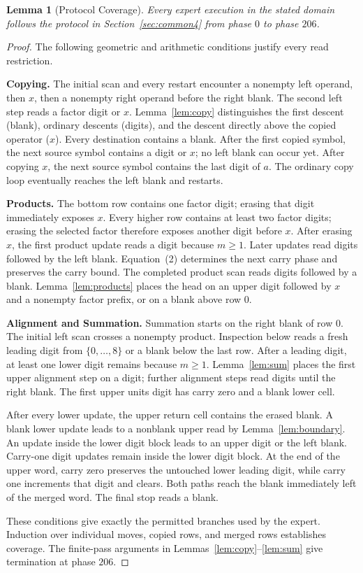 \documentclass[11pt,a4paper]{article}
\newtheorem{lemma}{Lemma}
\begin{document}
\begin{lemma}[Protocol Coverage]\label{lem:coverage}
Every expert execution in the stated domain follows the protocol in Section~\ref{sec:common4}
from phase $0$ to phase $206$.
\end{lemma}
\begin{proof}
The following geometric and arithmetic conditions justify every read restriction.

\textbf{Copying.}
The initial scan and every restart encounter a nonempty left operand,
then $x$, then a nonempty right operand before the right blank.
The second left step reads a factor digit or $x$.
Lemma~\ref{lem:copy} distinguishes the first descent (blank), ordinary descents
(digits), and the descent directly above the copied operator ($x$).
Every destination contains a blank. After the first copied symbol, the next
source symbol contains a digit or $x$; no left blank can occur yet.
After copying $x$, the next source symbol contains the last digit of $a$.
The ordinary copy loop eventually reaches the left blank and restarts.

\textbf{Products.}
The bottom row contains one factor digit; erasing that digit immediately
exposes $x$. Every higher row contains at least two factor digits;
erasing the selected factor therefore exposes another digit before $x$.
After erasing $x$, the first product update reads a digit because $m\ge1$.
Later updates read digits followed by the left blank.
Equation~(2) determines the next carry phase and preserves the carry bound.
The completed product scan reads digits followed by a blank.
Lemma~\ref{lem:products} places the head on an upper digit followed by $x$
and a nonempty factor prefix, or on a blank above row $0$.

\textbf{Alignment and Summation.}
Summation starts on the right blank of row $0$. The initial left scan crosses
a nonempty product. Inspection below reads a fresh leading digit from
$\{0,\ldots,8\}$ or a blank below the last row.
After a leading digit, at least one lower digit remains because $m\ge1$.
Lemma~\ref{lem:sum} places the first upper alignment step on a digit;
further alignment steps read digits until the right blank.
The first upper units digit has carry zero and a blank lower cell.

After every lower update, the upper return cell contains the erased blank.
A blank lower update leads to a nonblank upper read by
Lemma~\ref{lem:boundary}. An update inside the lower digit block leads to
an upper digit or the left blank. Carry-one digit updates remain inside
the lower digit block. At the end of the upper word, carry zero preserves
the untouched lower leading digit, while carry one increments that digit
and clears. Both paths reach the blank immediately left of the merged word.
The final stop reads a blank.

These conditions give exactly the permitted branches used by the expert.
Induction over individual moves, copied rows, and merged rows establishes
coverage. The finite-pass arguments in Lemmas~\ref{lem:copy}--\ref{lem:sum}
give termination at phase $206$.
\end{proof}
\end{document}
